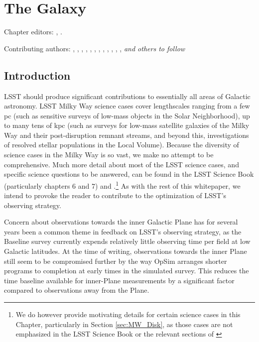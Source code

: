 
\chapter{The Galaxy}
\def\chpname{galaxy}\label{chp:\chpname}

Chapter editors:
,
.

Contributing authors:
,
,
,
,
,
,
,
,
, 
, 
,
, 
{\it and others to follow}



\section{Introduction}
\def\secname{MW_Intro}\label{sec:\secname}

LSST should produce significant contributions to essentially all
  areas of Galactic astronomy. LSST Milky Way science cases cover
  lengthscales ranging from a few pc (such as sensitive surveys of
  low-mass objects in the Solar Neighborhood), up to many tens of kpc
  (such as surveys for low-mass satellite galaxies of the Milky Way
  and their post-disruption remnant streams, and beyond this,
  investigations of resolved stellar populations in the Local
  Volume). Because the diversity of science cases in the Milky Way is
  so vast, we make no attempt to be comprehensive. Much more detail
  about most of the LSST science cases, and specific science questions
  to be answered, can be found in the LSST Science Book (particularly
  chapters 6 and 7) and \citet[][in particular Sections 2.1.4 and 4.4]{IvezicEtal2008}.\footnote{We 
  do however provide motivating details for certain science cases in
    this Chapter, particularly in Section \ref{sec:MW_Disk}, as those
    cases are not emphasized in the LSST Science Book or the relevant
    sections of \citet{IvezicEtal2008}} As with the rest of this
  whitepaper, we intend to provoke the reader to contribute to the
  optimization of LSST's observing strategy.

Concern about observations towards the inner Galactic Plane has
  for several years been a common theme in feedback on LSST's
  observing strategy, as the Baseline survey currently expends
  relatively little observing time per field at low Galactic
  latitudes. At the time of writing, observations towards the
    inner Plane still seem to be compromised further by the way OpSim
    arranges shorter programs to completion at early times in the
    simulated survey. This reduces the time baseline available for
    inner-Plane measurements by a significant factor compared to
    observations away from the Plane. 
    
